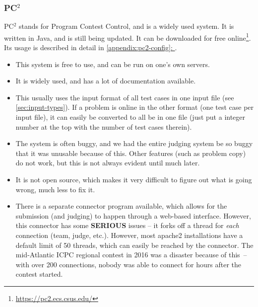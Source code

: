 \documentclass[11pt,twoside,letterpaper]{book}
\newcommand{\footurl}[1]{\footnote{\scriptsize\url{#1}}}
\newcommand*{\fullref}[1]{\hyperref[{#1}]{\autoref*{#1}: \nameref*{#1}}}
\providecommand{\tightlist}{%
  \setlength{\itemsep}{0pt}\setlength{\parskip}{0pt}}
\begin{document}
\subsubsection{PC$^2$}

PC$^2$ stands for Program Contest Control, and is a widely used
system.  It is written in Java, and is still being updated.  It can be
downloaded for free online\footurl{https://pc2.ecs.csus.edu/}.  Its
usage is described in detail in \fullref{appendix:pc2-config}.


\begin{itemize}
  \tightlist
\item This system is free to use, and can be run on one's own servers.
\item It is widely used, and has a lot of documentation available.
\item This usually uses the input format of all test cases in one
  input file (see \ref{sec:input-types}).  If a problem is online in
  the other format (one test case per input file), it can easily be
  converted to all be in one file (just put a integer number at the
  top with the number of test cases therein).
\end{itemize}


\begin{itemize}
  \tightlist
\item The system is often buggy, and we had the entire judging system
  be so buggy that it was unusable because of this.  Other features
  (such as problem copy) do not work, but this is not always evident
  until much later.
  \item It is not open source, which makes it very difficult to figure
    out what is going wrong, much less to fix it.
\end{itemize}


\begin{itemize}
  \tightlist
\item There is a separate connector program available, which allows
    for the submission (and judging) to happen through a web-based
    interface.  However, this connector has some {\bf SERIOUS} issues
    -- it forks off a thread for {\em each} connection (team, judge,
    etc.).  However, most apache2 installations have a default limit
    of 50 threads, which can easily be reached by the connector.  The
    mid-Atlantic ICPC regional contest in 2016 was a disaster because
    of this~-- with over 200 connections, nobody was able to connect
    for hours after the contest started.
\end{itemize}
\end{document}
